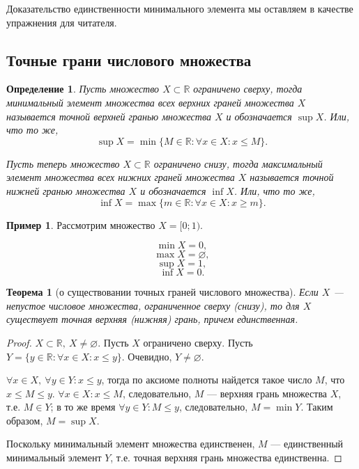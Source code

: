 \documentclass[a4paper,12pt]{article} %
\newtheorem{definition}{Определение}[section]
\newtheorem{theorem}{Теорема}[section]
\theoremstyle{remark}
\theoremstyle{definition}
\newtheorem{exmp}{Пример}[section]
\begin{document}
    Доказательство единственности минимального элемента мы оставляем в качестве упражнения для читателя.


\subsection{Точные грани числового множества}
\begin{definition}
    Пусть множество $X\subset \mathbb{R}$ ограничено сверху, тогда минимальный элемент множества всех верхних граней множества
    $X$ называется точной верхней гранью множества $X$ и обозначается $\sup X$. Или, что то же,
    \[\sup X = \min \{M\in \mathbb{R} : \forall x\in X : x \le M\}.\] 

    Пусть теперь множество $X\subset \mathbb{R}$ ограничено снизу, тогда максимальный элемент множества всех нижних граней
    множества $X$ называется точной нижней гранью множества $X$ и обозначается $\inf X$. Или, что то же,
    \[\inf X = \max \{m\in \mathbb{R} : \forall x\in X : x \ge m\}.\] 
\end{definition}
\begin{exmp}
    Рассмотрим множество $X = [0; 1)$.

    \[\min X = 0,\] 
    \[\max X = \varnothing,\] 
    \[\sup X = 1,\] 
    \[\inf X = 0.\] 
\end{exmp}

\begin{theorem}[о существовании точных граней числового множества]
    Если $X$ --- непустое числовое множества, ограниченное сверху (снизу), то для $X$ существует точная верхняя (нижняя)
    грань, причем единственная.
\end{theorem}
\begin{proof}
   $X\subset \mathbb{R}, \ X \neq \varnothing$. Пусть $X$ ограничено сверху.
   Пусть $Y = \{y\in \mathbb{R} : \forall x\in X : x\le y\}$. Очевидно, $Y\neq \varnothing$.

   $\forall x\in X, \ \forall y\in Y : x \le y$, тогда по аксиоме полноты найдется такое число $M$, что $x \le M \le y$.
   $\forall x \in X : x\le M$, следовательно, $M$ --- верхняя грань множества $X$, т.е. $M\in Y$;
   в то же время $\forall y\in Y : M\le y$, следовательно, $M=\min Y$. Таким образом, $M=\sup X$.

   Поскольку минимальный элемент множества единственен, $M$ --- единственный минимальный элемент $Y$, т.е. точная верхняя грань множества единственна.
\end{proof}
\end{document}
